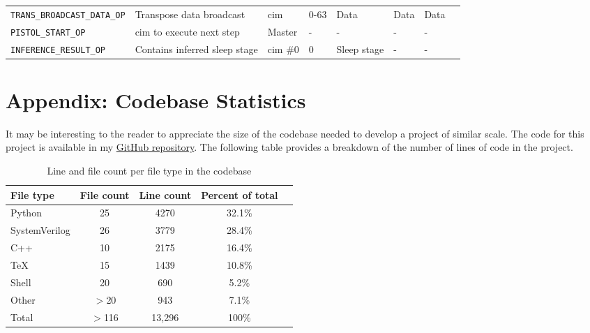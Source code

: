 \begin{sidewaystable}
\begin{tabular}{@{} p{6.5cm}lllllll @{}}
        \texttt{TRANS\_BROADCAST\_DATA\_OP}         & Transpose data broadcast          & \ac{cim}      & 0-63          & Data              & Data              & Data \\
        \texttt{PISTOL\_START\_OP}                  & \ac{cim} to execute next step     & Master        & -             & -                 & -                 & - \\
        \texttt{INFERENCE\_RESULT\_OP}              & Contains inferred sleep stage     & \ac{cim} \#0  & 0             & Sleep stage       & -                 & - \\
    \end{tabular}
    \label{tab:bus_ops}
\end{sidewaystable}

\section{Appendix: Codebase Statistics}
It may be interesting to the reader to appreciate the size of the codebase needed to develop a project of similar scale. The code for this project is available 
in my \href{https://github.com/TristanRobitaille/engsci-thesis}{GitHub repository}. The following table provides a breakdown of the number of lines of code in the project.

\begin{table}
    \centering
    \renewcommand{\arraystretch}{1.2} %
    \setlength{\arrayrulewidth}{1.5pt} %
    \caption{Line and file count per file type in the codebase}
    \begin{tabular}{@{} p{4cm}cccr @{}}
        \toprule
        File type       & File count    & Line count    & Percent of total & \\\midrule
        Python          & 25            & 4270          & 32.1\% \\
        SystemVerilog   & 26            & 3779          & 28.4\% \\
        C++             & 10            & 2175          & 16.4\% \\
        TeX             & 15            & 1439          & 10.8\%  \\
        Shell           & 20            & 690           & 5.2\%  \\
        Other           & $>$20         & 943           & 7.1\%  \\\midrule
        Total           & $>$116        & 13,296        & 100\%  \\
        \hline
    \end{tabular}
    \label{tab:line_cnt}
\end{table}

